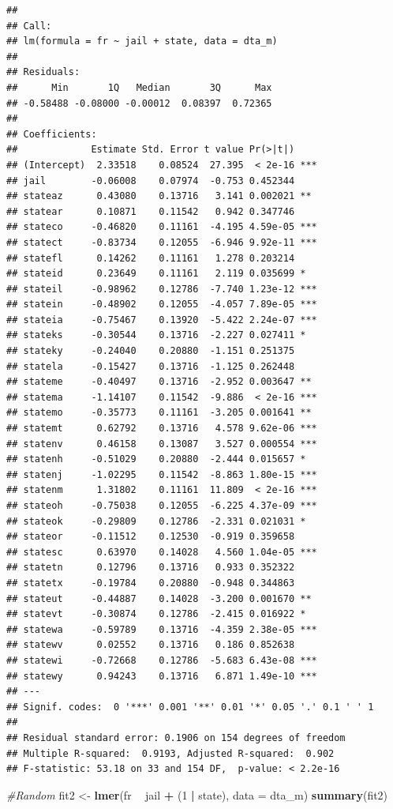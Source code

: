 \documentclass[]{article}
\newenvironment{Shaded}{\begin{snugshade}}{\end{snugshade}}
\newcommand{\CommentTok}[1]{\textcolor[rgb]{0.56,0.35,0.01}{\textit{#1}}}
\newcommand{\DataTypeTok}[1]{\textcolor[rgb]{0.13,0.29,0.53}{#1}}
\newcommand{\DecValTok}[1]{\textcolor[rgb]{0.00,0.00,0.81}{#1}}
\newcommand{\KeywordTok}[1]{\textcolor[rgb]{0.13,0.29,0.53}{\textbf{#1}}}
\newcommand{\NormalTok}[1]{#1}
\newcommand{\OperatorTok}[1]{\textcolor[rgb]{0.81,0.36,0.00}{\textbf{#1}}}
\newcommand{\StringTok}[1]{\textcolor[rgb]{0.31,0.60,0.02}{#1}}
\begin{document}
\begin{verbatim}
## 
## Call:
## lm(formula = fr ~ jail + state, data = dta_m)
## 
## Residuals:
##      Min       1Q   Median       3Q      Max 
## -0.58488 -0.08000 -0.00012  0.08397  0.72365 
## 
## Coefficients:
##             Estimate Std. Error t value Pr(>|t|)    
## (Intercept)  2.33518    0.08524  27.395  < 2e-16 ***
## jail        -0.06008    0.07974  -0.753 0.452344    
## stateaz      0.43080    0.13716   3.141 0.002021 ** 
## statear      0.10871    0.11542   0.942 0.347746    
## stateco     -0.46820    0.11161  -4.195 4.59e-05 ***
## statect     -0.83734    0.12055  -6.946 9.92e-11 ***
## statefl      0.14262    0.11161   1.278 0.203214    
## stateid      0.23649    0.11161   2.119 0.035699 *  
## stateil     -0.98962    0.12786  -7.740 1.23e-12 ***
## statein     -0.48902    0.12055  -4.057 7.89e-05 ***
## stateia     -0.75467    0.13920  -5.422 2.24e-07 ***
## stateks     -0.30544    0.13716  -2.227 0.027411 *  
## stateky     -0.24040    0.20880  -1.151 0.251375    
## statela     -0.15427    0.13716  -1.125 0.262448    
## stateme     -0.40497    0.13716  -2.952 0.003647 ** 
## statema     -1.14107    0.11542  -9.886  < 2e-16 ***
## statemo     -0.35773    0.11161  -3.205 0.001641 ** 
## statemt      0.62792    0.13716   4.578 9.62e-06 ***
## statenv      0.46158    0.13087   3.527 0.000554 ***
## statenh     -0.51029    0.20880  -2.444 0.015657 *  
## statenj     -1.02295    0.11542  -8.863 1.80e-15 ***
## statenm      1.31802    0.11161  11.809  < 2e-16 ***
## stateoh     -0.75038    0.12055  -6.225 4.37e-09 ***
## stateok     -0.29809    0.12786  -2.331 0.021031 *  
## stateor     -0.11512    0.12530  -0.919 0.359658    
## statesc      0.63970    0.14028   4.560 1.04e-05 ***
## statetn      0.12796    0.13716   0.933 0.352322    
## statetx     -0.19784    0.20880  -0.948 0.344863    
## stateut     -0.44887    0.14028  -3.200 0.001670 ** 
## statevt     -0.30874    0.12786  -2.415 0.016922 *  
## statewa     -0.59789    0.13716  -4.359 2.38e-05 ***
## statewv      0.02552    0.13716   0.186 0.852638    
## statewi     -0.72668    0.12786  -5.683 6.43e-08 ***
## statewy      0.94243    0.13716   6.871 1.49e-10 ***
## ---
## Signif. codes:  0 '***' 0.001 '**' 0.01 '*' 0.05 '.' 0.1 ' ' 1
## 
## Residual standard error: 0.1906 on 154 degrees of freedom
## Multiple R-squared:  0.9193, Adjusted R-squared:  0.902 
## F-statistic: 53.18 on 33 and 154 DF,  p-value: < 2.2e-16
\end{verbatim}

\begin{Shaded}
\begin{Highlighting}[]
\CommentTok{#Random}
\NormalTok{fit2 <-}\StringTok{ }\KeywordTok{lmer}\NormalTok{(fr }\OperatorTok{~}\StringTok{ }\NormalTok{jail }\OperatorTok{+}\StringTok{ }\NormalTok{(}\DecValTok{1} \OperatorTok{|}\StringTok{ }\NormalTok{state), }\DataTypeTok{data =}\NormalTok{ dta_m)}
\KeywordTok{summary}\NormalTok{(fit2)}
\end{Highlighting}
\end{Shaded}
\end{document}
